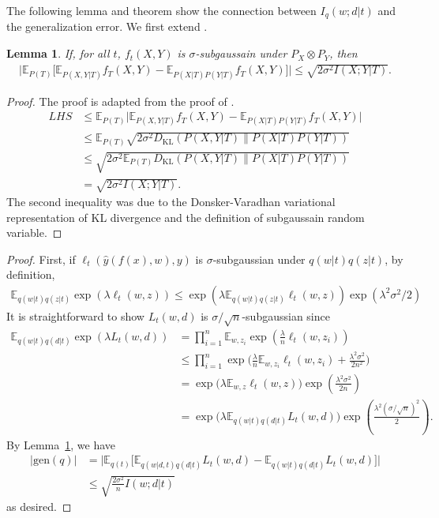\documentclass{article} \usepackage{iclr2020_conference,times}
\newcommand{\E}{\mathbb{E}}
\newtheorem{lemm}{Lemma}
\begin{document}
The following lemma and theorem show the connection between $I_q(w; d | t)$ and the generalization error.
We first extend \citet[Lemma 4.2]{xu2016information}.
\begin{lemm} 
    \label{thm:subg}
    If, for all $t$, $f_t(X, Y)$ is $\sigma$-subgaussain under $P_X \otimes P_Y$, then 
    \begin{align}
        \Big| \E_{P(T)} \Big[ \E_{P(X,Y | T)} f_T(X, Y) - \E_{P(X | T)P(Y | T)} f_T(X,Y) \Big] \Big|  \leq \sqrt{2\sigma^2 I(X; Y | T)}.
    \end{align}
\end{lemm}
\begin{proof}
    The proof is adapted from the proof of \citet[Lemma 4.2]{xu2016information}.
    \begin{align}
        LHS &\leq \E_{P(T)} \Big| \E_{P(X,Y | T)} f_T(X, Y) - \E_{P(X | T)P(Y | T)} f_T(X,Y) \Big| \\
        &\leq \E_{P(T)} \sqrt{2 \sigma^2 D_\text{KL}(P(X,Y|T) \| P(X|T) P(Y|T)) } \\
        &\leq \sqrt{2\sigma^2 \E_{P(T)} D_\text{KL}(P(X,Y|T) \| P(X|T) P(Y|T))} \\
        &= \sqrt{2\sigma^2 I(X;Y|T)}.
    \end{align}
    The second inequality was due to the Donsker-Varadhan variational representation of KL divergence and the definition of subgaussain random variable.
\end{proof}

\genmi
\begin{proof}
    First, if $\ell_t(\hat{y}(f(x),w), y)$ is $\sigma$-subgaussian under $q(w|t)q(z|t)$, by definition,
    \begin{align}
        \E_{q(w|t)q(z|t)} \exp({\lambda \ell_t(w, z)}) \leq \exp({\lambda \E_{q(w|t)q(z|t)} \ell_t(w,z)}) \exp({\lambda^2 \sigma^2/2})
    \end{align}
    It is straightforward to show $L_t(w, d)$ is $\sigma/\sqrt{n}$-subgaussian since
    \begin{align}
        \E_{q(w|t)q(d|t)} \exp({\lambda L_t(w, d)}) &= \prod_{i=1}^n \E_{w,z_i} \exp(\frac{\lambda}{n} \ell_t(w, z_i)) \\
        &\leq \prod_{i=1}^n \exp\Big( \frac{\lambda}{n} \E_{w, z_i} \ell_t(w, z_i) + \frac{\lambda^2 \sigma^2}{2n^2} \Big) \\
        &= \exp\Big( \lambda \E_{w, z} \ell_t(w, z) \Big) \exp(\frac{\lambda^2 \sigma^2}{2n}) \\
        &= \exp\Big( \lambda \E_{q(w|t) q(d|t)} L_t(w, d) \Big) \exp(\frac{\lambda^2 (\sigma/\sqrt{n})^2}{2}).
    \end{align}
    By Lemma~\ref{thm:subg}, we have
    \begin{align}
        \big| \text{gen}(q) \big| &= \Big| \E_{q(t)} \Big[ \E_{q(w|d , t)q(d|t)} L_t(w, d) - \E_{q(w|t)q(d|t)} L_t(w,d) \Big] \Big| \\
        &\leq \sqrt{\frac{2\sigma^2}{n} I(w; d | t)}
    \end{align}
    as desired.
\end{proof}
\end{document}
